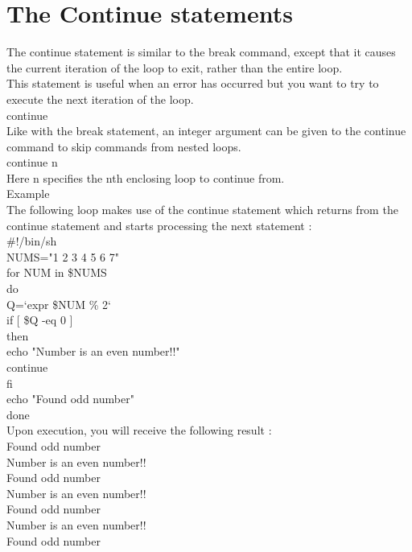 \documentclass{article}
\begin{document}
\section*{The Continue statements}
The continue statement is similar to the break command, except that it causes the current iteration of the loop to exit, rather than the entire loop.\\
This statement is useful when an error has occurred but you want to try to execute the next iteration of the loop.\\
continue\\
Like with the break statement, an integer argument can be given to the continue command to skip commands from nested loops.\\
continue n\\
Here n specifies the nth enclosing loop to continue from.\\
Example\\
The following loop makes use of the continue statement which returns from the continue statement and starts processing the next statement :\\
\#!/bin/sh\\
NUMS="1 2 3 4 5 6 7"\\
for NUM in \$NUMS\\
do\\
   Q=`expr \$NUM \% 2`\\
   if [ \$Q -eq 0 ]\\
   then\\
      echo "Number is an even number!!"\\
      continue\\
   fi\\
   echo "Found odd number"\\
done\\
Upon execution, you will receive the following result :\\
Found odd number\\
Number is an even number!!\\
Found odd number\\
Number is an even number!!\\
Found odd number\\
Number is an even number!!\\
Found odd number\\

\end{document}
